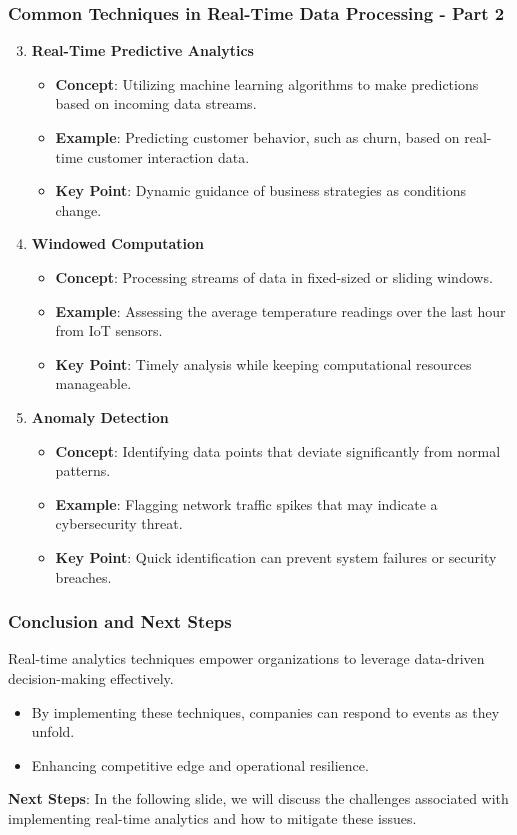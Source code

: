 \documentclass[aspectratio=169]{beamer}
\begin{document}
\begin{frame}[fragile]
    \frametitle{Common Techniques in Real-Time Data Processing - Part 2}
    \begin{enumerate}
        \setcounter{enumi}{2} %
        \item \textbf{Real-Time Predictive Analytics}
        \begin{itemize}
            \item \textbf{Concept}: Utilizing machine learning algorithms to make predictions based on incoming data streams.
            \item \textbf{Example}: Predicting customer behavior, such as churn, based on real-time customer interaction data.
            \item \textbf{Key Point}: Dynamic guidance of business strategies as conditions change.
        \end{itemize}

        \item \textbf{Windowed Computation}
        \begin{itemize}
            \item \textbf{Concept}: Processing streams of data in fixed-sized or sliding windows.
            \item \textbf{Example}: Assessing the average temperature readings over the last hour from IoT sensors.
            \item \textbf{Key Point}: Timely analysis while keeping computational resources manageable.
        \end{itemize}

        \item \textbf{Anomaly Detection}
        \begin{itemize}
            \item \textbf{Concept}: Identifying data points that deviate significantly from normal patterns.
            \item \textbf{Example}: Flagging network traffic spikes that may indicate a cybersecurity threat.
            \item \textbf{Key Point}: Quick identification can prevent system failures or security breaches.
        \end{itemize}
    \end{enumerate}
\end{frame}

\begin{frame}[fragile]
    \frametitle{Conclusion and Next Steps}
    Real-time analytics techniques empower organizations to leverage data-driven decision-making effectively. 
    \begin{itemize}
        \item By implementing these techniques, companies can respond to events as they unfold.
        \item Enhancing competitive edge and operational resilience.
    \end{itemize}

    \textbf{Next Steps}: In the following slide, we will discuss the challenges associated with implementing real-time analytics and how to mitigate these issues.
\end{frame}
\end{document}
